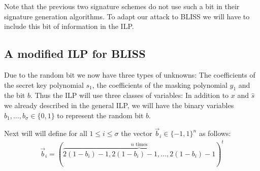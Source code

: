 Note that the previous two signature schemes do not use such a bit in their signature generation algorithms. To adapt our attack to BLISS we will have to include this bit of information in the ILP.

\subsection{A modified ILP for BLISS}
Due to the random bit we now have three types of unknowns: The coefficients of the secret key polynomial $s_{1}$, the coefficients of the masking polynomial $y_{1}$ and the bit $b$.
Thus the ILP will use three classes of variables: In addition to $x$ and $\hat{s}$ we already described in the general ILP, we will have the binary variables $b_1, \ldots, b_σ \in \{0, 1\}$ to represent the random bit $b$.  


Next will will define for all $1 \leq i \leq σ$ the vector $\vec{b}_i \in \{-1, 1\}^{n}$ as follows:%
\begin{align}
	\vec{b}_i = (\overbrace{2(1-b_{i})-1, 2(1-b_{i})-1, \ldots, 2(1-b_{i})-1}^{n \text{ times}})^t\end{align}

